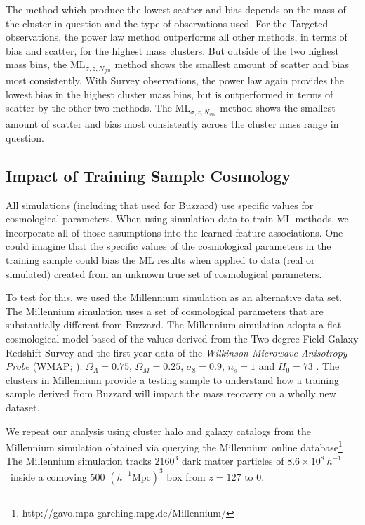 The method which produce the lowest scatter and bias depends on the mass of the cluster in question and the type of observations used. For the Targeted observations, the power law method outperforms all other methods, in terms of bias and scatter, for the highest mass clusters. But outside of the two highest mass bins, the $\mathrm{ML}_{\sigma, z, N_{gal}}$ method shows the smallest amount of scatter and bias most consistently. With Survey observations, the power law again provides the lowest bias in the highest cluster mass bins, but is outperformed in terms of scatter by the other two methods. The $\mathrm{ML}_{\sigma, z, N_{gal}}$ method shows the smallest amount of scatter and bias most consistently across the cluster mass range in question.
 
\subsection{Impact of Training Sample Cosmology}
All simulations (including that used for Buzzard) use specific values for cosmological parameters. When using simulation data to train ML methods, we incorporate all of those assumptions into the learned feature associations. One could imagine that the specific values of the cosmological parameters in the training sample could bias the ML results when applied to data (real or simulated) created from an unknown true set of cosmological parameters. 

To test for this, we used the Millennium simulation as an alternative data set. The Millennium simulation uses a set of cosmological parameters that are substantially different from Buzzard. The Millennium simulation adopts a flat cosmological model based of the values derived from the Two-degree Field Galaxy Redshift Survey \citep{Colless2001} and the first year data of the \emph{Wilkinson Microwave Anisotropy Probe} (WMAP; \citealt{Spergel2003}): $\Omega_\Lambda = 0.75$, $\Omega_M = 0.25$, $\sigma_8 = 0.9$, $n_s = 1$ and $H_0= 73$ \kms \mpc. The clusters in Millennium provide a testing sample to understand how a training sample derived from Buzzard will impact the mass recovery on a wholly new dataset. 

We repeat our analysis using cluster halo and galaxy catalogs from the Millennium simulation \citep{Springel2005a} obtained via querying the Millennium online database\footnote{http://gavo.mpa-garching.mpg.de/Millennium/} \citep{Lemson2006}. The Millennium simulation tracks $2160^3$ dark matter particles of $8.6\times 10^8 ~h^{-1}$ \Msol\ inside a comoving 500 $(h^{-1} \mathrm{Mpc})^3$ box from $z=127$ to 0. 

